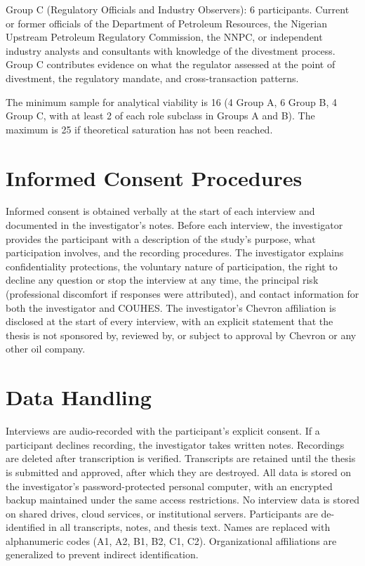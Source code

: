 Group C (Regulatory Officials and Industry Observers): 6 participants.
Current or former officials of the Department of Petroleum Resources,
the Nigerian Upstream Petroleum Regulatory Commission, the NNPC, or
independent industry analysts and consultants with knowledge of the
divestment process. Group C contributes evidence on what the regulator
assessed at the point of divestment, the regulatory mandate, and
cross-transaction patterns.

The minimum sample for analytical viability is 16 (4 Group A, 6 Group B,
4 Group C, with at least 2 of each role subclass in Groups A and B). The
maximum is 25 if theoretical saturation has not been reached.

\hypertarget{informed-consent-procedures}{%
\section{Informed Consent
Procedures}\label{informed-consent-procedures}}

Informed consent is obtained verbally at the start of each interview and
documented in the investigator's notes. Before each interview, the
investigator provides the participant with a description of the study's
purpose, what participation involves, and the recording procedures. The
investigator explains confidentiality protections, the voluntary nature
of participation, the right to decline any question or stop the
interview at any time, the principal risk (professional discomfort if
responses were attributed), and contact information for both the
investigator and COUHES. The investigator's Chevron affiliation is
disclosed at the start of every interview, with an explicit statement
that the thesis is not sponsored by, reviewed by, or subject to approval
by Chevron or any other oil company.

\hypertarget{data-handling}{%
\section{Data Handling}\label{data-handling}}

Interviews are audio-recorded with the participant's explicit consent.
If a participant declines recording, the investigator takes written
notes. Recordings are deleted after transcription is verified.
Transcripts are retained until the thesis is submitted and approved,
after which they are destroyed. All data is stored on the investigator's
password-protected personal computer, with an encrypted backup
maintained under the same access restrictions. No interview data is
stored on shared drives, cloud services, or institutional servers.
Participants are de-identified in all transcripts, notes, and thesis
text. Names are replaced with alphanumeric codes (A1, A2, B1, B2, C1,
C2). Organizational affiliations are generalized to prevent indirect
identification.

